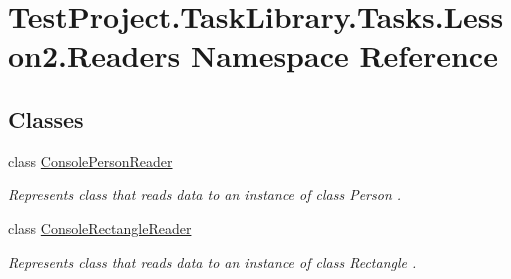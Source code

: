 \hypertarget{namespace_test_project_1_1_task_library_1_1_tasks_1_1_lesson2_1_1_readers}{}\section{Test\+Project.\+Task\+Library.\+Tasks.\+Lesson2.\+Readers Namespace Reference}
\label{namespace_test_project_1_1_task_library_1_1_tasks_1_1_lesson2_1_1_readers}
\subsection*{Classes}
\begin{DoxyCompactItemize}
\item 
class \mbox{\hyperlink{class_test_project_1_1_task_library_1_1_tasks_1_1_lesson2_1_1_readers_1_1_console_person_reader}{Console\+Person\+Reader}}
\begin{DoxyCompactList}\small\item\em Represents class that reads data to an instance of class Person . \end{DoxyCompactList}\item 
class \mbox{\hyperlink{class_test_project_1_1_task_library_1_1_tasks_1_1_lesson2_1_1_readers_1_1_console_rectangle_reader}{Console\+Rectangle\+Reader}}
\begin{DoxyCompactList}\small\item\em Represents class that reads data to an instance of class Rectangle . \end{DoxyCompactList}\end{DoxyCompactItemize}
